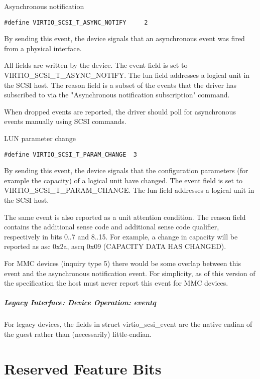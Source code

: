   Asynchronous notification
\begin{lstlisting}
#define VIRTIO_SCSI_T_ASYNC_NOTIFY     2
\end{lstlisting}

  By sending this event, the device signals that an asynchronous
  event was fired from a physical interface.

  All fields are written by the device. The event field is set to
  VIRTIO_SCSI_T_ASYNC_NOTIFY. The lun field addresses a logical
  unit in the SCSI host. The reason field is a subset of the
  events that the driver has subscribed to via the "Asynchronous
  notification subscription" command.

  When dropped events are reported, the driver should poll for
  asynchronous events manually using SCSI commands.

  LUN parameter change
\begin{lstlisting}
#define VIRTIO_SCSI_T_PARAM_CHANGE  3
\end{lstlisting}

  By sending this event, the device signals that the configuration parameters
  (for example the capacity) of a logical unit have changed.
  The event field is set to VIRTIO_SCSI_T_PARAM_CHANGE.
  The lun field addresses a logical unit in the SCSI host.

  The same event is also reported as a unit attention condition.
  The reason field contains the additional sense code and additional sense code qualifier,
  respectively in bits 0..7 and 8..15.
  For example, a change in capacity will be reported as asc 0x2a, ascq 0x09
  (CAPACITY DATA HAS CHANGED).

  For MMC devices (inquiry type 5) there would be some overlap between this
  event and the asynchronous notification event.
  For simplicity, as of this version of the specification the host must
  never report this event for MMC devices.

\paragraph{Legacy Interface: Device Operation: eventq}\label{sec:Device Types / SCSI Host Device / Device Operation / Device Operation: eventq / Legacy Interface: Device Operation: eventq}
For legacy devices, the fields in struct virtio_scsi_event are the
native endian of the guest rather than (necessarily) little-endian.

\chapter{Reserved Feature Bits}\label{sec:Reserved Feature Bits}

